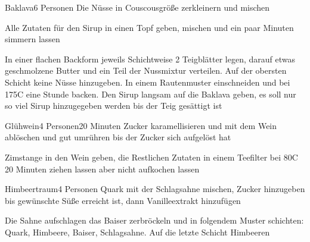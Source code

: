 \documentclass{book}
\begin{document}
\tableofcontents
\newpage



\begin{recipe}{Baklava}{6 Personen}{}
Die Nüsse in Couscousgröße zerkleinern und mischen

Alle Zutaten für den Sirup in einen Topf geben, mischen und ein paar Minuten simmern lassen

In einer flachen Backform jeweils Schichtweise 2 Teigblätter legen, darauf etwas geschmolzene Butter und ein Teil der Nussmixtur verteilen. Auf der obersten Schicht keine Nüsse hinzugeben.
In einem Rautenmuster einschneiden und bei 175\0C eine Stunde backen.
Den Sirup langsam auf die Baklava geben, es soll nur so viel Sirup hinzugegeben werden bis der Teig gesättigt ist
\end{recipe}


\begin{recipe}{Glühwein}{4 Personen}{20 Minuten}
Zucker karamellisieren und mit dem Wein ablöschen und gut umrühren bis der Zucker sich aufgelöst hat

Zimstange in den Wein geben, die Restlichen Zutaten in einem Teefilter bei 80\0C 20 Minuten ziehen lassen aber nicht aufkochen lassen
\end{recipe}


\begin{recipe}{Himbeertraum}{4 Personen}{}
Quark mit der Schlagsahne mischen, Zucker hinzugeben bis gewünschte Süße erreicht ist, dann Vanilleextrakt hinzufügen

Die Sahne aufschlagen das Baiser zerbröckeln und in folgendem Muster schichten: 
Quark, Himbeere, Baiser, Schlagsahne. Auf die letzte Schicht Himbeeren
\end{recipe}
\end{document}
